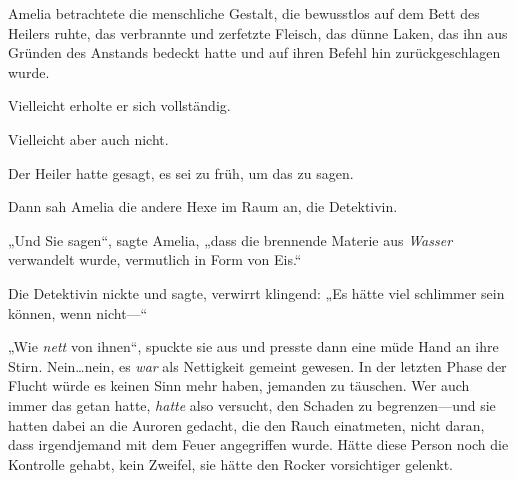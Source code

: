 Amelia betrachtete die menschliche Gestalt, die bewusstlos auf dem Bett des Heilers ruhte, das verbrannte und zerfetzte Fleisch, das dünne Laken, das ihn aus Gründen des Anstands bedeckt hatte und auf ihren Befehl hin zurückgeschlagen wurde.

Vielleicht erholte er sich vollständig.

Vielleicht aber auch nicht.

Der Heiler hatte gesagt, es sei zu früh, um das zu sagen.

Dann sah Amelia die andere Hexe im Raum an, die Detektivin.

„Und Sie sagen“, sagte Amelia, „dass die brennende Materie aus \emph{Wasser} verwandelt wurde, vermutlich in Form von Eis.“

Die Detektivin nickte und sagte, verwirrt klingend: „Es hätte viel schlimmer sein können, wenn nicht—“

„Wie \emph{nett} von ihnen“, spuckte sie aus und presste dann eine müde Hand an ihre Stirn. Nein…nein, es \emph{war} als Nettigkeit gemeint gewesen. In der letzten Phase der Flucht würde es keinen Sinn mehr haben, jemanden zu täuschen. Wer auch immer das getan hatte, \emph{hatte} also versucht, den Schaden zu begrenzen—und sie hatten dabei an die Auroren gedacht, die den Rauch einatmeten, nicht daran, dass irgendjemand mit dem Feuer angegriffen wurde. Hätte diese Person noch die Kontrolle gehabt, kein Zweifel, sie hätte den Rocker vorsichtiger gelenkt.

